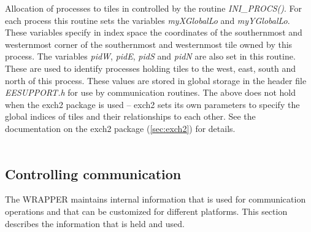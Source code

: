 Allocation of processes to tiles in controlled by the routine
{\em INI\_PROCS()}. For each process this routine sets
the variables {\em myXGlobalLo} and {\em myYGlobalLo}.
These variables specify in index space the coordinates
of the southernmost and westernmost corner of the 
southernmost and westernmost tile owned by this process.
The variables {\em pidW}, {\em pidE}, {\em pidS} and {\em pidN}
are also set in this routine. These are used to identify
processes holding tiles to the west, east, south and north 
of this process. These values are stored in global storage
in the header file {\em EESUPPORT.h} for use by
communication routines.  The above does not hold when the 
exch2 package is used -- exch2 sets its own parameters to 
specify the global indices of tiles and their relationships
to each other.  See the documentation on the exch2 package
(\ref{sec:exch2})  for
details.
\\

 \\


\subsection{Controlling communication}
The WRAPPER maintains internal information that is used for communication
operations and that can be customized for different platforms. This section 
describes the information that is held and used.

